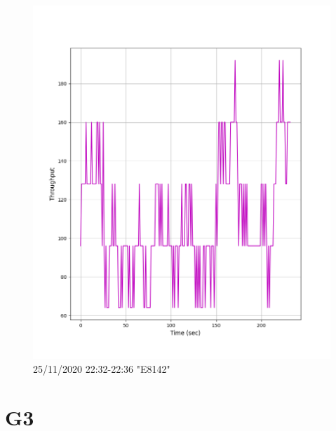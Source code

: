 \documentclass[hidelinks, 12pt, a4paper]{article}
\begin{document}
\begin{figure}[h!]
\centering
	\includegraphics[height=.38\textheight, width=\textwidth]{assets/session1/g2.png}
	\caption{25/11/2020 22:32-22:36 "E8142"} 
\end{figure}


\section{G3}
\end{document}
